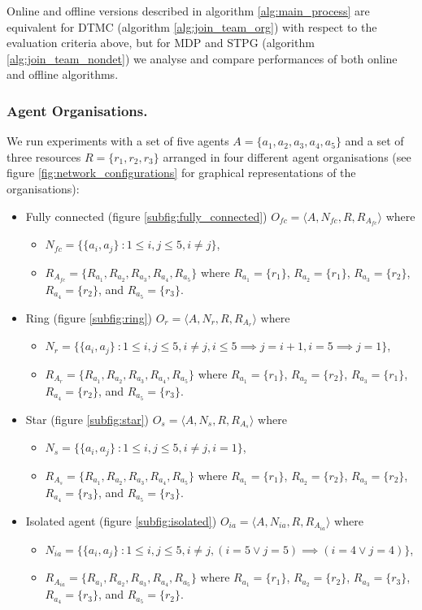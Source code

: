 \documentclass{llncs}
\begin{document}
Online and offline versions described in algorithm \ref{alg:main_process} are equivalent for DTMC (algorithm \ref{alg:join_team_org}) with respect to the evaluation criteria above, but for MDP and STPG (algorithm \ref{alg:join_team_nondet}) we analyse and compare performances of both online and offline algorithms.


\subsubsection{Agent Organisations.}
We run experiments with a set of five agents $A= \{ a_1,a_2,a_3,a_4,a_5 \} $ and a set of  three resources $R=\{r_1,r_2,r_3\}$ arranged in four different agent organisations (see figure \ref{fig:network_configurations} for graphical representations of the organisations):
\begin{itemize}
 \item Fully connected (figure \ref{subfig:fully_connected}) $O_{fc}=\langle A, N_{fc}, R, R_{A_{fc}}  \rangle$ where
    \begin{itemize}
    \item $N_{fc}=\{\{a_i,a_j \}\ : 1 \le i,j \le 5, i\neq j \}$,
    \item $R_{A_{fc}}=\{R_{a_1}, R_{a_2}, R_{a_3}, R_{a_4}, R_{a_5}\}$ where $R_{a_1}=\{r_1\}$, $R_{a_2}=\{r_1\}$, $R_{a_3}=\{r_2\}$, $R_{a_4}=\{r_2\}$, and $R_{a_5}=\{r_3\}$.
    \end{itemize}
 \item Ring (figure \ref{subfig:ring}) $O_r=\langle A, N_r, R, R_{A_r}  \rangle$ where
    \begin{itemize}
    \item $N_r=\{\{a_i,a_j \}\ : 1 \le i,j \le 5, i\neq j, i\le 5 \implies j=i+1, i=5 \implies j=1 \}$,
    \item $R_{A_r}=\{R_{a_1}, R_{a_2}, R_{a_3}, R_{a_4}, R_{a_5}\}$ where $R_{a_1}=\{r_1\}$, $R_{a_2}=\{r_2\}$, $R_{a_3}=\{r_1\}$, $R_{a_4}=\{r_2\}$, and $R_{a_5}=\{r_3\}$.
    \end{itemize}
 \item Star (figure \ref{subfig:star}) $O_s=\langle A, N_s, R, R_{A_s}  \rangle$ where
    \begin{itemize}
    \item $N_s=\{\{a_i,a_j \}\ : 1 \le i,j \le 5, i\neq j, i=1 \}$,
    \item $R_{A_s}=\{R_{a_1}, R_{a_2}, R_{a_3}, R_{a_4}, R_{a_5}\}$ where $R_{a_1}=\{r_1\}$, $R_{a_2}=\{r_2\}$, $R_{a_3}=\{r_2\}$, $R_{a_4}=\{r_3\}$, and $R_{a_5}=\{r_3\}$.
    \end{itemize}
 \item Isolated agent (figure \ref{subfig:isolated}) $O_{ia}=\langle A, N_{ia}, R, R_{A_{ia}}  \rangle$ where
    \begin{itemize}
    \item $N_{ia}=\{\{a_i,a_j \}\ : 1 \le i,j \le 5, i\neq j, (i=5 \vee j=5) \implies (i=4 \vee j=4) \}$,
    \item $R_{A_{ia}}=\{R_{a_1}, R_{a_2}, R_{a_3}, R_{a_4}, R_{a_5}\}$ where $R_{a_1}=\{r_1\}$, $R_{a_2}=\{r_2\}$, $R_{a_3}=\{r_3\}$, $R_{a_4}=\{r_3\}$, and $R_{a_5}=\{r_2\}$. 
    \end{itemize}
\end{itemize}
\end{document}
